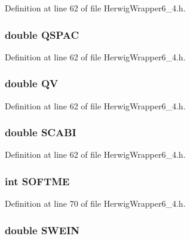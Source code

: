 Definition at line 62 of file Herwig\-Wrapper6\_\-4.h.
\subsubsection{\setlength{\rightskip}{0pt plus 5cm}double {\bf QSPAC}}\label{HerwigWrapper6__4_8h_93618d57384ca0cbe264cc317e5b8374}




Definition at line 62 of file Herwig\-Wrapper6\_\-4.h.
\subsubsection{\setlength{\rightskip}{0pt plus 5cm}double {\bf QV}}\label{HerwigWrapper6__4_8h_8146beb6562ae4c0b3f4057fc61a55ee}




Definition at line 62 of file Herwig\-Wrapper6\_\-4.h.
\subsubsection{\setlength{\rightskip}{0pt plus 5cm}double {\bf SCABI}}\label{HerwigWrapper6__4_8h_e025ee76f3a6e9b6d006fa1a71b1cc36}




Definition at line 62 of file Herwig\-Wrapper6\_\-4.h.
\subsubsection{\setlength{\rightskip}{0pt plus 5cm}int {\bf SOFTME}}\label{HerwigWrapper6__4_8h_e5ab4d9bcf762fd34bb70f239b6c28b6}




Definition at line 70 of file Herwig\-Wrapper6\_\-4.h.
\subsubsection{\setlength{\rightskip}{0pt plus 5cm}double {\bf SWEIN}}\label{HerwigWrapper6__4_8h_6993ee83f9dbfb9858c8f5d97e991f5e}




